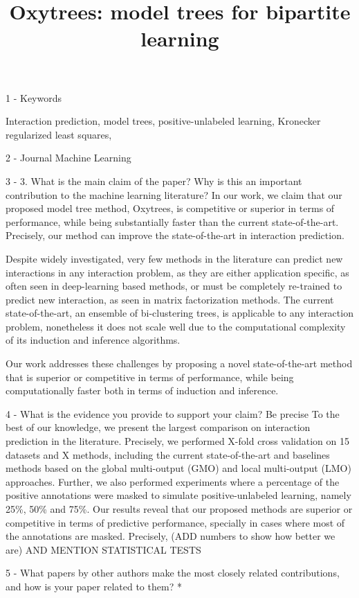 \documentclass[sn-mathphys-num]{sn-jnl}
\begin{document}
\title[Oxytrees]{Oxytrees: model trees for bipartite learning}
1 -  Keywords

Interaction prediction, model trees, positive-unlabeled learning, Kronecker regularized least squares,  

2 -  Journal
Machine Learning


3 -  3. What is the main claim of the paper? Why is this an important contribution to the machine learning literature?  
In our work, we claim that our proposed model tree method, Oxytrees, is competitive or superior in terms of performance, while being substantially faster than the current state-of-the-art. Precisely, our method can improve the state-of-the-art in interaction prediction.

Despite widely investigated, very few methods in the literature can predict new interactions in any interaction problem, as they are either application specific, as often seen in deep-learning based methods, or must be completely re-trained to predict new interaction, as seen in matrix factorization methods. The current state-of-the-art, an ensemble of bi-clustering trees, is applicable to any interaction problem, nonetheless it does not scale well due to the computational complexity of its induction and inference algorithms. 

Our work addresses these challenges by proposing a novel state-of-the-art method that is superior or competitive in terms of performance, while being computationally faster both in terms of induction and inference. 


4 - What is the evidence you provide to support your claim? Be precise
To the best of our knowledge, we present the largest comparison on interaction prediction in the literature. Precisely, we performed X-fold cross validation on 15 datasets and X methods, including the current state-of-the-art and baselines methods based  on the global multi-output (GMO) and local multi-output (LMO) approaches. Further, we also performed experiments where a percentage of the positive annotations were masked to simulate positive-unlabeled learning, namely 25\%, 50\% and 75\%.  Our results reveal that our proposed methods are superior or competitive in terms of predictive performance, specially in cases where most of the annotations are masked. Precisely, (ADD numbers to show how better we are) AND MENTION STATISTICAL TESTS

5 - What papers by other authors make the most closely related contributions, and how is your paper related to them? * 
\end{document}
